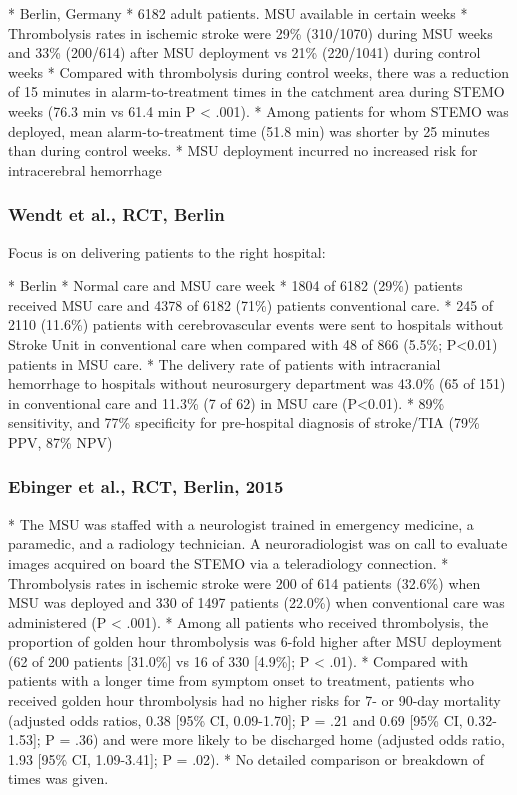 \begin{markdown}
* Berlin, Germany
* 6182 adult patients. MSU available in certain weeks
* Thrombolysis rates in ischemic stroke were 29\% (310/1070) during MSU weeks and 33\% (200/614) after MSU deployment vs 21\% (220/1041) during control weeks
* Compared with thrombolysis during control weeks, there was a reduction of 15 minutes in alarm-to-treatment times in the catchment area during STEMO weeks (76.3 min vs 61.4 min P < .001).
* Among patients for whom STEMO was deployed, mean alarm-to-treatment time (51.8 min) was shorter by 25 minutes than during control weeks.
* MSU deployment incurred no increased risk for intracerebral hemorrhage 
\end{markdown}

\subsubsection{Wendt et al., RCT, Berlin \cite{wendt_improved_2015}}

Focus is on delivering patients to the right hospital:

\begin{markdown}
* Berlin
* Normal care and MSU care week
* 1804 of 6182 (29\%) patients received MSU care and 4378 of 6182 (71\%) patients conventional care.
* 245 of 2110 (11.6\%) patients with cerebrovascular events were sent to hospitals without Stroke Unit in conventional care when compared with 48 of 866 (5.5\%; P<0.01) patients in MSU care.
* The delivery rate of patients with intracranial hemorrhage to hospitals without neurosurgery department was 43.0\% (65 of 151) in conventional care and 11.3\% (7 of 62) in MSU care (P<0.01).
* 89\% sensitivity, and 77\% specificity for pre-hospital diagnosis of stroke/TIA (79\% PPV, 87\% NPV)
\end{markdown}

\subsubsection{Ebinger et al., RCT, Berlin, 2015 \cite{ebinger_effects_2015}}

* The MSU was staffed with a neurologist trained in emergency medicine, a
paramedic, and a radiology technician. A neuroradiologist was on call to evaluate images acquired on board the STEMO via a teleradiology connection.
* Thrombolysis rates in ischemic stroke were 200 of 614 patients (32.6\%) when MSU was deployed and 330 of 1497 patients (22.0\%) when conventional care was administered (P < .001).
* Among all patients who received thrombolysis, the proportion of golden hour thrombolysis was 6-fold higher after MSU deployment (62 of 200 patients [31.0\%] vs 16 of 330 [4.9\%]; P < .01).
* Compared with patients with a longer time from symptom onset to treatment, patients who received golden hour thrombolysis had no higher risks for 7- or 90-day mortality (adjusted odds ratios, 0.38 [95\% CI, 0.09-1.70]; P = .21 and 0.69 [95\% CI, 0.32-1.53]; P = .36) and were more likely to be discharged home (adjusted odds ratio, 1.93 [95\% CI, 1.09-3.41]; P = .02).
* No detailed comparison or breakdown of times was given.

